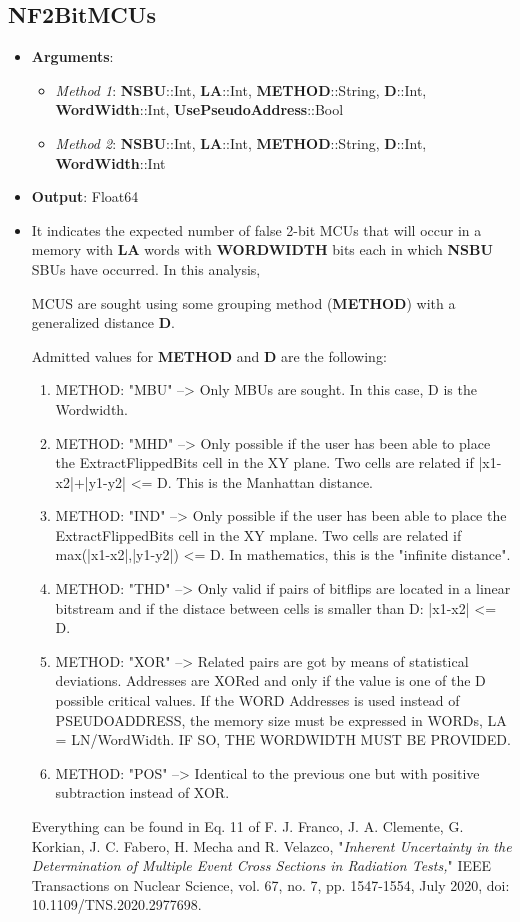 \subsection*{NF2BitMCUs}
%
\begin{itemize}
	\item \textbf{Arguments}: 
		\begin{itemize}
			\item \textit{Method 1}: \textbf{NSBU}::Int, \textbf{LA}::Int, \textbf{METHOD}::String, \textbf{D}::Int, \textbf{WordWidth}::Int, \textbf{UsePseudoAddress}::Bool
			\item \textit{Method 2}: \textbf{NSBU}::Int, \textbf{LA}::Int, \textbf{METHOD}::String, \textbf{D}::Int, \textbf{WordWidth}::Int
		\end{itemize}
	\item \textbf{Output}: Float64
	\item It indicates the expected number of false 2-bit MCUs that will occur 
	 in a memory with \textbf{LA} words with \textbf{WORDWIDTH} bits each in which \textbf{NSBU} SBUs have occurred. In this analysis,
	
	 MCUS are sought using some grouping method (\textbf{METHOD}) with a generalized distance \textbf{D}.
	
	 Admitted values for \textbf{METHOD} and \textbf{D} are the following:
	 
	 \begin{enumerate}
	 	\item METHOD: "MBU" --> Only MBUs are sought. In this case, D is the Wordwidth.
	 	\item METHOD: "MHD" --> Only possible if the user has been able to place the ExtractFlippedBits 	 	cell in the XY plane. Two cells are related if |x1-x2|+|y1-y2| <= D. This 
	 	is the Manhattan distance.
	 	\item METHOD: "IND" --> Only possible if the user has been able to place the ExtractFlippedBits
	 	cell in the XY mplane. Two cells are related if max(|x1-x2|,|y1-y2|) <= D.
	 	In mathematics, this is the "infinite distance".
	 	\item METHOD: "THD" --> Only valid if pairs of bitflips are located in a linear bitstream and if the
	 	distace between cells is smaller than D: |x1-x2| <= D.
	 	\item METHOD: "XOR" --> Related pairs are got by means of statistical deviations. Addresses are XORed 
	 	and only if the value is one of the D possible critical values. If the WORD Addresses  
	 	is used instead of PSEUDOADDRESS, the memory size must be expressed in WORDs, 
	 	LA = LN/WordWidth.
	 	IF SO, THE WORDWIDTH MUST BE PROVIDED.
	 	\item METHOD: "POS" --> Identical to the previous one but with positive subtraction instead of XOR.
	 \end{enumerate}
	 
	   Everything can be found in Eq. 11 of F. J. Franco, J. A. Clemente, G. Korkian, 
	   J. C. Fabero, H. Mecha and R. Velazco, "\textit{Inherent Uncertainty in the Determination of Multiple 
	   Event Cross Sections in Radiation Tests,}" IEEE Transactions on Nuclear Science, vol. 67, no. 7, 
	   pp. 1547-1554, July 2020, doi: 10.1109/TNS.2020.2977698.
\end{itemize}
%

